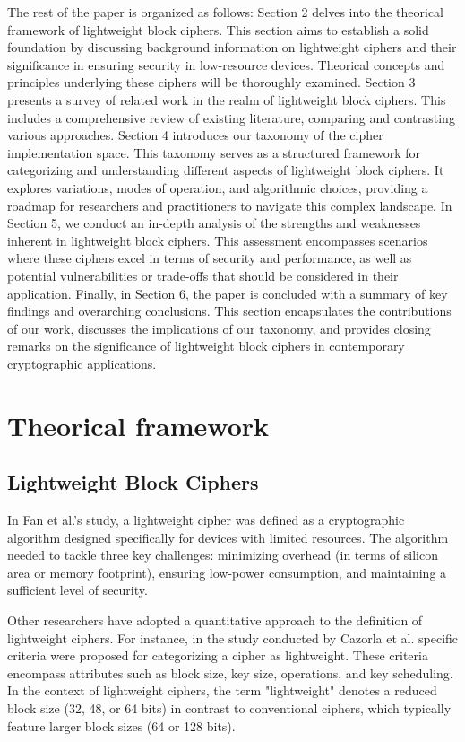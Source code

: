 \documentclass[conference,compsoc]{IEEEtran}
\begin{document}
The rest of the paper is organized as follows: Section 2 delves into the theorical framework of lightweight block ciphers. This section aims to establish a solid foundation by discussing background information on lightweight ciphers and their significance in ensuring security in low-resource devices. Theorical concepts and principles underlying these ciphers will be thoroughly examined. Section 3 presents a survey of related work in the realm of lightweight block ciphers. This includes a comprehensive review of existing literature, comparing and contrasting various approaches. Section 4 introduces our taxonomy of the cipher implementation space. This taxonomy serves as a structured framework for categorizing and understanding different aspects of lightweight block ciphers. It explores variations, modes of operation, and algorithmic choices, providing a roadmap for researchers and practitioners to navigate this complex landscape. In Section 5, we conduct an in-depth analysis of the strengths and weaknesses inherent in lightweight block ciphers. This assessment encompasses scenarios where these ciphers excel in terms of security and performance, as well as potential vulnerabilities or trade-offs that should be considered in their application. Finally, in Section 6, the paper is concluded with a summary of key findings and overarching conclusions. This section encapsulates the contributions of our work, discusses the implications of our taxonomy, and provides closing remarks on the significance of lightweight block ciphers in contemporary cryptographic applications.

\section{Theorical framework}
\subsection{Lightweight Block Ciphers}
In Fan et al.'s study, a lightweight cipher was defined as a cryptographic algorithm designed specifically for devices with limited resources. The algorithm needed to tackle three key challenges: minimizing overhead (in terms of silicon area or memory footprint), ensuring low-power consumption, and maintaining a sufficient level of security.

Other researchers have adopted a quantitative approach to the definition of lightweight ciphers. For instance, in the study conducted by Cazorla et al. specific criteria were proposed for categorizing a cipher as lightweight. These criteria encompass attributes such as block size, key size, operations, and key scheduling. In the context of lightweight ciphers, the term "lightweight" denotes a reduced block size (32, 48, or 64 bits) in contrast to conventional ciphers, which typically feature larger block sizes (64 or 128 bits).
\end{document}
